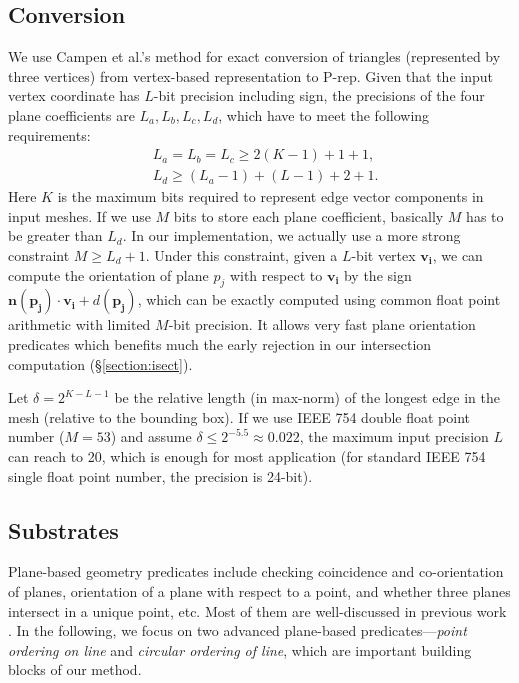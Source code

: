 \documentclass[10pt,journal,compsoc]{IEEEtran}
\begin{document}
\subsection{Conversion}

\label{sec:convert}

We use Campen et al.'s method \cite{campen2010exact} for exact conversion of triangles (represented by three vertices) from vertex-based representation to P-rep. Given that the input vertex coordinate has $L$-bit precision including sign, the precisions of the four plane coefficients are $L_a, L_b, L_c, L_d$, which have to meet the following requirements:
\begin{equation}
\begin{split}
&L_a=L_b=L_c\ge 2(K-1)+1+1,\\
&L_d\ge(L_a-1)+(L-1)+2+1.
\end{split}
\end{equation}
Here $K$ is the maximum bits required to represent edge vector components in input meshes. If we use $M$ bits to store each plane coefficient, basically $M$ has to be greater than $L_d$. In our implementation, we actually use a more strong constraint $M \ge L_d+1$. Under this constraint, given a $L$-bit vertex $\bm{v_i}$, we can compute the orientation of plane $p_j$ with respect to $\bm{v_i}$ by the sign $\bm{n}(\bm{p_j})\cdot\bm{v_i} + d(\bm{p_j})$, which can be exactly computed using common float point arithmetic with limited $M$-bit precision. It allows very fast plane orientation predicates which benefits much the early rejection in our intersection computation (\S \ref{section:isect}).


Let $\delta = 2^{K-L-1}$ be the relative length (in max-norm) of the longest edge in the mesh (relative to the bounding box). If we use IEEE 754 double float point number ($M=53$) and assume $\delta \le 2^{-5.5} \approx 0.022$, the maximum input precision $L$ can reach to 20, which is enough for most application (for standard IEEE 754 single float point number, the precision is 24-bit).


\subsection{Substrates}
\label{sec:substrates}
Plane-based geometry predicates include checking coincidence and co-orientation of planes, orientation of a plane with respect to a point, and whether three planes intersect in a unique point, etc. Most of them are well-discussed in previous work \cite{bernstein2009fast,banerjee1996topologically}. In the following, we focus on two advanced plane-based predicates---\emph{point ordering on line} and \emph{circular ordering of line}, which are important building blocks of our method.
\end{document}
